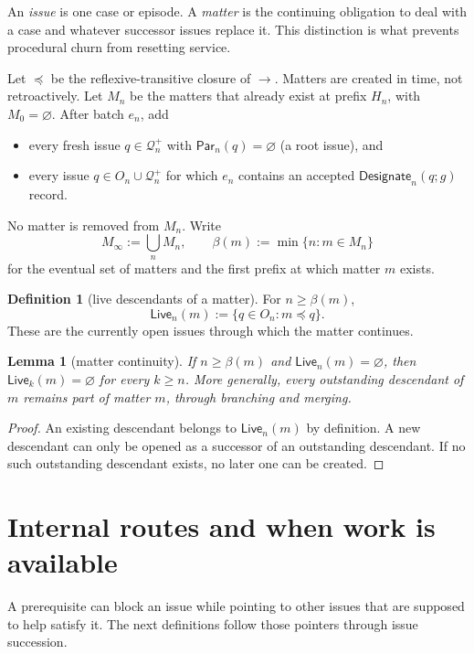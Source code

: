 \documentclass[11pt]{article}
\newtheorem{lemma}{Lemma}
\theoremstyle{definition}
\newtheorem*{definition}{Definition}
\theoremstyle{remark}
\newcommand{\Designate}{\mathsf{Designate}}
\newcommand{\Live}{\mathsf{Live}}
\newcommand{\Par}{\mathsf{Par}}
\newcommand{\Born}{\mathcal Q^{+}}
\begin{document}
An \emph{issue} is one case or episode. A \emph{matter} is the continuing
obligation to deal with a case and whatever successor issues replace it.
This distinction is what prevents procedural churn from resetting service.

Let $\preceq$ be the reflexive-transitive closure of $\to$. Matters are created
in time, not retroactively. Let $M_n$ be the matters that already exist at
prefix $H_n$, with $M_0=\varnothing$. After batch $e_n$, add
\begin{itemize}[itemsep=1pt,topsep=2pt]
 \item every fresh issue $q\in\Born_n$ with $\Par_n(q)=\varnothing$ (a root
       issue), and
 \item every issue $q\in O_n\cup\Born_n$ for which $e_n$ contains an accepted
       $\Designate_n(q;g)$ record.
\end{itemize}
No matter is removed from $M_n$. Write
\[
 M_\infty:=\bigcup_n M_n,
 \qquad
 \beta(m):=\min\{n:m\in M_n\}
\]
for the eventual set of matters and the first prefix at which matter $m$
exists.

\begin{definition}[live descendants of a matter]
For $n\ge\beta(m)$,
\[
 \Live_n(m):=\{q\in O_n:m\preceq q\}.
\]
These are the currently open issues through which the matter continues.
\end{definition}

\begin{lemma}[matter continuity]\label{lem:matter-continuity}
If $n\ge\beta(m)$ and $\Live_n(m)=\varnothing$, then
$\Live_k(m)=\varnothing$ for every $k\ge n$. More generally, every outstanding
descendant of $m$ remains part of matter $m$, through branching and merging.
\end{lemma}

\begin{proof}
An existing descendant belongs to $\Live_n(m)$ by definition. A new descendant
can only be opened as a successor of an outstanding descendant. If no such
outstanding descendant exists, no later one can be created.
\end{proof}

\section{Internal routes and when work is available}\label{sec:work}

A prerequisite can block an issue while pointing to other issues that are
supposed to help satisfy it. The next definitions follow those pointers through
issue succession.
\end{document}
